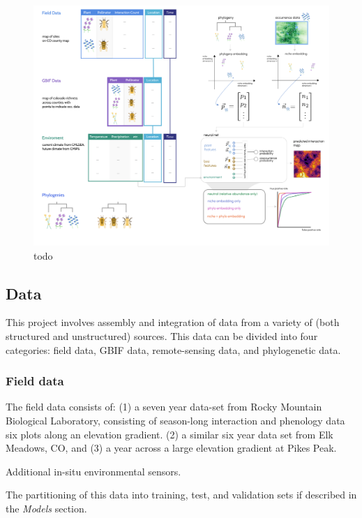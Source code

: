 \documentclass[11pt]{article}
\makeatletter
\def\maxwidth{\ifdim\Gin@nat@width>\linewidth\linewidth
\else\Gin@nat@width\fi}
\let\Oldincludegraphics\includegraphics
\renewcommand{\includegraphics}[1]{\Oldincludegraphics[width=\maxwidth]{#1}}
\makeatother
\begin{document}
\begin{figure}
\hypertarget{fig:concept}{%
\centering
\includegraphics{./figures/concept_v2.png}
\caption{todo}\label{fig:concept}
}
\end{figure}

\hypertarget{data}{%
\subsection{Data}\label{data}}

This project involves assembly and integration of data from a variety of
(both structured and unstructured) sources. This data can be divided
into four categories: field data, GBIF data, remote-sensing data, and
phylogenetic data.

\hypertarget{field-data}{%
\subsubsection{Field data}\label{field-data}}

The field data consists of: (1) a seven year data-set from Rocky
Mountain Biological Laboratory, consisting of season-long interaction
and phenology data six plots along an elevation gradient. (2) a similar
six year data set from Elk Meadows, CO, and (3) a year across a large
elevation gradient at Pikes Peak.

Additional in-situ environmental sensors.

The partitioning of this data into training, test, and validation sets
if described in the \emph{Models} section.
\end{document}
